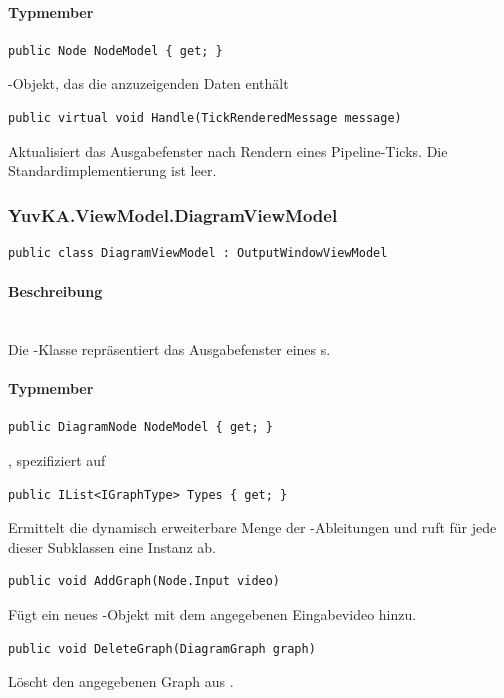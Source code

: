 \paragraph{Typmember}
\begin{itemize}

	\begin{verbatim}
public Node NodeModel { get; }
	\end{verbatim}
	-Objekt, das die anzuzeigenden Daten enthält	

	\begin{verbatim}
public virtual void Handle(TickRenderedMessage message)
	\end{verbatim}
	Aktualisiert das Ausgabefenster nach Rendern eines Pipeline-Ticks. Die Standardimplementierung ist leer.

\end{itemize}

\subsubsection{YuvKA.ViewModel.DiagramViewModel}

\begin{verbatim}
public class DiagramViewModel : OutputWindowViewModel
\end{verbatim}

\paragraph{Beschreibung}~\\
Die -Klasse repräsentiert das Ausgabefenster eines s.

\paragraph{Typmember}
\begin{itemize}

	\begin{verbatim}
public DiagramNode NodeModel { get; }
	\end{verbatim}
	, spezifiziert auf 

	\begin{verbatim}
public IList<IGraphType> Types { get; }
	\end{verbatim}
	Ermittelt die dynamisch erweiterbare Menge der -Ableitungen und ruft für jede dieser Subklassen eine Instanz ab.

	\begin{verbatim}
public void AddGraph(Node.Input video)
	\end{verbatim}
	Fügt  ein neues -Objekt mit dem angegebenen Eingabevideo hinzu.

	\begin{verbatim}
public void DeleteGraph(DiagramGraph graph)
	\end{verbatim}
	Löscht den angegebenen Graph aus .


\end{itemize}

